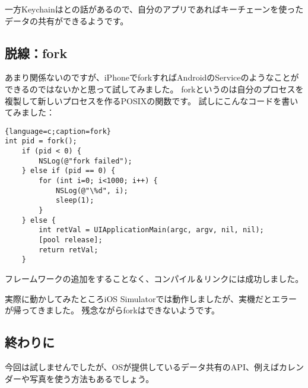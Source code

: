\documentclass[b5paper]{jsarticle}
\begin{document}
一方Keychainはとの話があるので、自分のアプリであればキーチェーンを使ったデータの共有ができるようです。

\subsection{脱線：fork}
あまり関係ないのですが、iPhoneでforkすればAndroidのServiceのようなことができるのではないかと思って試してみました。
forkというのは自分のプロセスを複製して新しいプロセスを作るPOSIXの関数です。
試しにこんなコードを書いてみました：
\begin{lstlisting}{language=c;caption=fork}
int pid = fork();
	if (pid < 0) {
		NSLog(@"fork failed");
	} else if (pid == 0) {
		for (int i=0; i<1000; i++) {
			NSLog(@"\%d", i);
			sleep(1);
		}
	} else {
		int retVal = UIApplicationMain(argc, argv, nil, nil);
		[pool release];
		return retVal;
	}
\end{lstlisting}
フレームワークの追加をすることなく、コンパイル＆リンクには成功しました。

実際に動かしてみたところiOS Simulatorでは動作しましたが、実機だとエラーが帰ってきました。
残念ながらforkはできないようです。

\subsection{終わりに}
今回は試しませんでしたが、OSが提供しているデータ共有のAPI、例えばカレンダーや写真を使う方法もあるでしょう。
\end{document}
